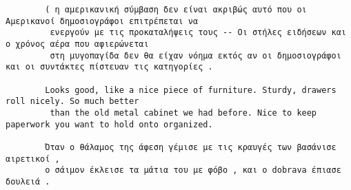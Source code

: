 \documentclass[11pt, a4paper]{article}
\begin{document}
\begin{verbatim}
		( η αμερικανική σύμβαση δεν είναι ακριβώς αυτό που οι Αμερικανοί δημοσιογράφοι επιτρέπεται να
		 ενεργούν με τις προκαταλήψεις τους -- Οι στήλες ειδήσεων και ο χρόνος αέρα που αφιερώνεται 
		 στη μυγοπαγίδα δεν θα είχαν νόημα εκτός αν οι δημοσιογράφοι και οι συντάκτες πίστευαν τις κατηγορίες .
		
		Looks good, like a nice piece of furniture. Sturdy, drawers roll nicely. So much better
		 than the old metal cabinet we had before. Nice to keep paperwork you want to hold onto organized.
		
		Όταν ο θάλαμος της άφεση γέμισε με τις κραυγές των βασάνισε αιρετικοί , 
		ο σάιμον έκλεισε τα μάτια του με φόβο , και ο dobrava έπιασε δουλειά .
	\end{verbatim}
	
\end{document}
